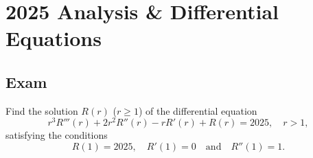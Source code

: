 \section{2025 Analysis \& Differential Equations}

\subsection{Exam}

\begin{exercise}
\label{analysis:2025:1}
Find the solution $R(r)$ ($r\geq 1$) of the differential equation
\[
r^3 R'''(r) + 2r^2 R''(r) - rR'(r) + R(r) = 2025,\quad r>1,
\]
satisfying the conditions
\[
R(1) = 2025,\quad R'(1) = 0 \quad \text{and}\quad R''(1) = 1.
\]
\end{exercise}

